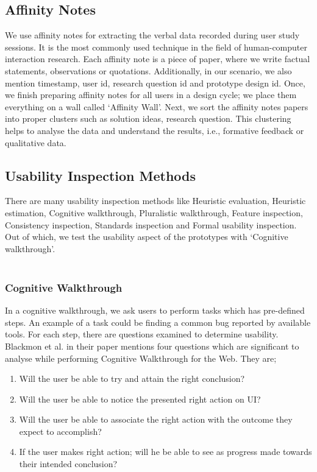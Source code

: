 \subsection{Affinity Notes}

We use affinity notes \cite{affinity} for extracting the verbal data recorded during user study sessions. It is the most commonly used technique in the field of human-computer interaction research. Each affinity note is a piece of paper, where we write factual statements, observations or quotations. Additionally, in our scenario, we also mention timestamp, user id, research question id and prototype design id. Once, we finish preparing affinity notes for all users in a design cycle; we place them everything on a wall called ‘Affinity Wall’. Next, we sort the affinity notes papers into proper clusters such as solution ideas, research question. This clustering helps to analyse the data and understand the results, i.e., formative feedback or qualitative data. \\


\subsection{Usability Inspection Methods}
\hfill \break
There are many usability inspection methods \cite{nielsen1994usability} like Heuristic evaluation, Heuristic estimation, Cognitive walkthrough, Pluralistic walkthrough, Feature inspection, Consistency inspection, Standards inspection and Formal usability inspection. Out of which, we test the usability aspect of the prototypes with ‘Cognitive walkthrough’. \\ \\

\subsubsection{Cognitive Walkthrough}
\hfill \break
In a cognitive walkthrough, we ask users to perform tasks which has pre-defined steps. An example of a task could be finding a common bug reported by available tools. For each step, there are questions examined to determine usability. Blackmon et al. in their paper \cite{blackmon2002cognitive} mentions four questions which are significant to analyse while performing Cognitive Walkthrough for the Web. They are; \\

\begin{enumerate}
\item Will the user be able to try and attain the right conclusion?
\item Will the user be able to notice the presented right action on UI?
\item Will the user be able to associate the right action with the outcome they expect to accomplish?
\item If the user makes right action; will he be able to see as progress made towards their intended conclusion? \\
\end{enumerate}

